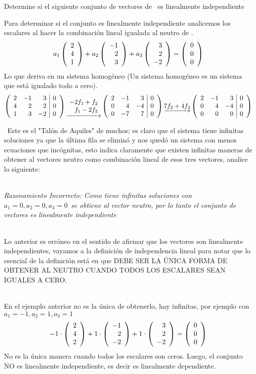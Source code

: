 \begin{ejemplo}
Determine si el siguiente conjunto de vectores de \rtres\ es linealmente independiente 
\end{ejemplo}
Para determinar si el conjunto es linealmente independiente analicemos los escalares al hacer la combinación lineal igualada al neutro de \rtres.
\[
a_1\vectrtres{2}{4}{1}+
a_2\vectrtres{-1}{2}{3}+
a_3\vectrtres{3}{2}{-2}=
\vectrtres{0}{0}{0}
\]
Lo que deriva en un sistema homogéneo (Un sistema homogéneo es un sistema que está igualado todo a cero).
$$\reducir{rrr|r}{2&-1&3&0\\4&2&2&0\\1&3&-2&0}
\underrightarrow{\begin{array}{r}
    -2f_1 + f_2\\
    f_1 - 2f_3
\end{array}}
\reducir{rrr|r}{2&-1&3&0\\0&4&-4&0\\0&-7&7&0}
\underrightarrow{7f_2 + 4f_3}
\reducir{rrr|r}{2&-1&3&0\\0&4&-4&0\\0&0&0&0}$$

\obs\ Este es el "Talón de Aquiles" de muchos; es claro que el sistema tiene infinitas soluciones ya que la última fila se eliminó y nos quedó un sistema con menos ecuaciones que incógnitas, esto indica claramente que existen infinitas maneras de obtener al vectores neutro como combinación lineal de esos tres vectores, analice lo siguiente:

~\\
\textsl{Razonamiento Incorrecto: 
Como tiene infinitas soluciones con $a_1=0, a_2=0, a_3=0$\ se obtiene al vector neutro, por lo tanto el conjunto de vectores es linealmente independiente}

~\\
Lo anterior es erróneo en el sentido de afirmar que los vectores son linealmente independientes,
vayamos a la definición de independencia lineal para notar que lo esencial de la definición está en que DEBE SER LA ÚNICA FORMA DE OBTENER AL NEUTRO CUANDO TODOS LOS ESCALARES SEAN IGUALES A CERO.

~\\
En el ejemplo anterior no es la única de obtenerlo, hay infinitas, por ejemplo con $a_1=-1, a_2=1, a_3=1$
\[-1\cdot\vectrtres{2}{4}{2}+
1\cdot\vectrtres{-1}{2}{-2}+
1\cdot\vectrtres{3}{2}{-2}=
\vectrtres{0}{0}{0}
\]
No es la única manera cuando todos los escalares son ceros. Luego, el conjunto NO es linealmente independiente, es decir es linealmente dependiente.
